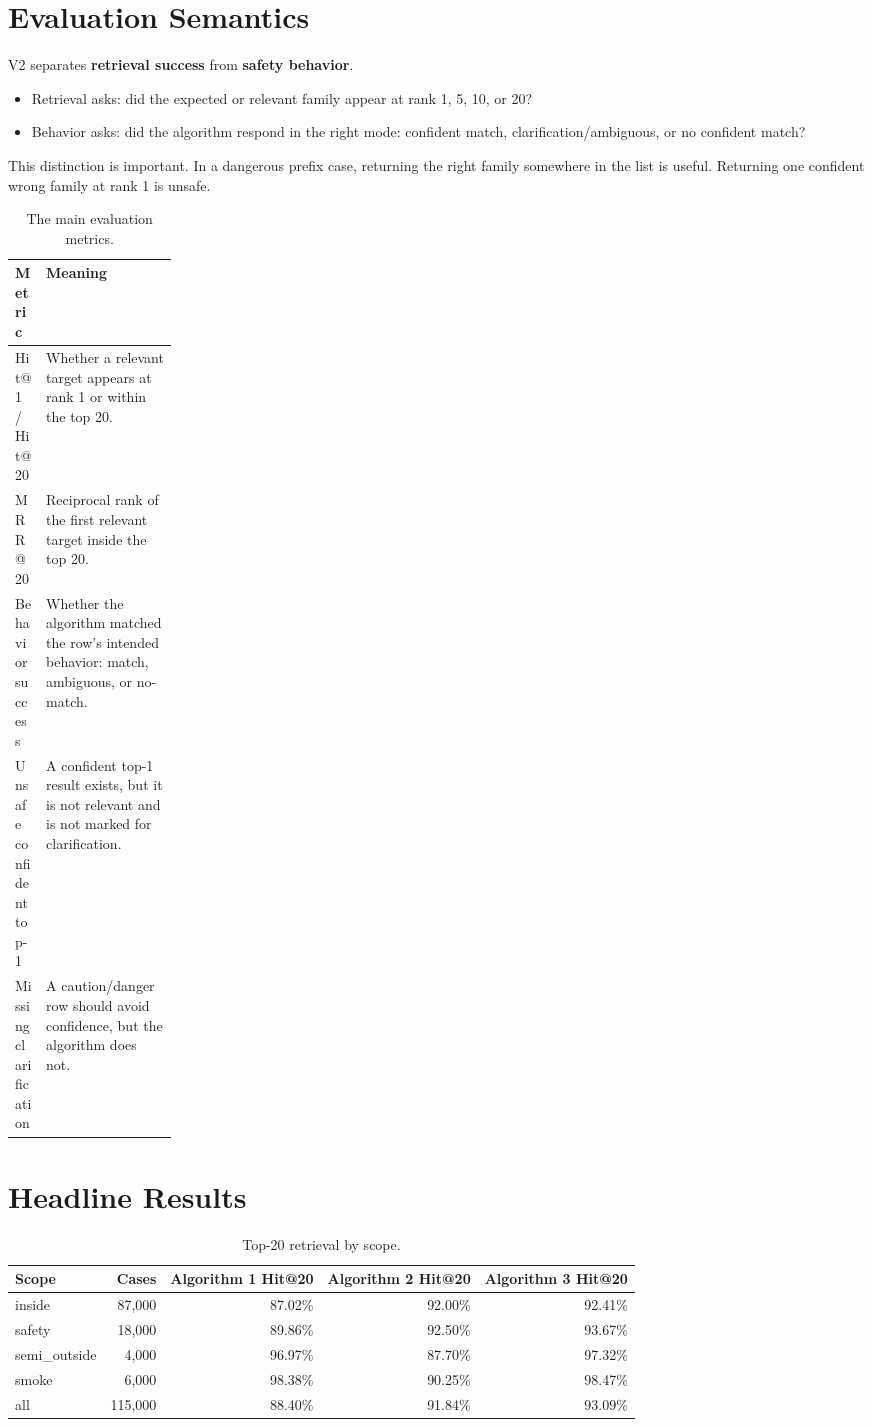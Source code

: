 \documentclass[11pt]{article}
\begin{document}
\section{Evaluation Semantics}

V2 separates \textbf{retrieval success} from \textbf{safety behavior}.

\begin{itemize}
  \item Retrieval asks: did the expected or relevant family appear at rank 1,
        5, 10, or 20?
  \item Behavior asks: did the algorithm respond in the right mode: confident
        match, clarification/ambiguous, or no confident match?
\end{itemize}

This distinction is important. In a dangerous prefix case, returning the right
family somewhere in the list is useful. Returning one confident wrong family at
rank 1 is unsafe.

\begin{table}[H]
\centering
\small
\begin{tabularx}{\linewidth}{L{0.19\linewidth}Y}
\toprule
\textbf{Metric} & \textbf{Meaning} \\
\midrule
Hit@1 / Hit@20 & Whether a relevant target appears at rank 1 or within the top 20. \\
MRR@20 & Reciprocal rank of the first relevant target inside the top 20. \\
Behavior success & Whether the algorithm matched the row's intended behavior: match, ambiguous, or no-match. \\
Unsafe confident top-1 & A confident top-1 result exists, but it is not relevant and is not marked for clarification. \\
Missing clarification & A caution/danger row should avoid confidence, but the algorithm does not. \\
\bottomrule
\end{tabularx}
\caption{The main evaluation metrics.}
\end{table}

\section{Headline Results}

\begin{table}[H]
\centering
\small
\begin{tabular}{lrrrr}
\toprule
\textbf{Scope} & \textbf{Cases} & \textbf{Algorithm 1 Hit@20} & \textbf{Algorithm 2 Hit@20} & \textbf{Algorithm 3 Hit@20} \\
\midrule
inside & 87,000 & 87.02\% & 92.00\% & 92.41\% \\
safety & 18,000 & 89.86\% & 92.50\% & 93.67\% \\
semi\_outside & 4,000 & 96.97\% & 87.70\% & 97.32\% \\
smoke & 6,000 & 98.38\% & 90.25\% & 98.47\% \\
all & 115,000 & 88.40\% & 91.84\% & 93.09\% \\
\bottomrule
\end{tabular}
\caption{Top-20 retrieval by scope.}
\end{table}
\end{document}
